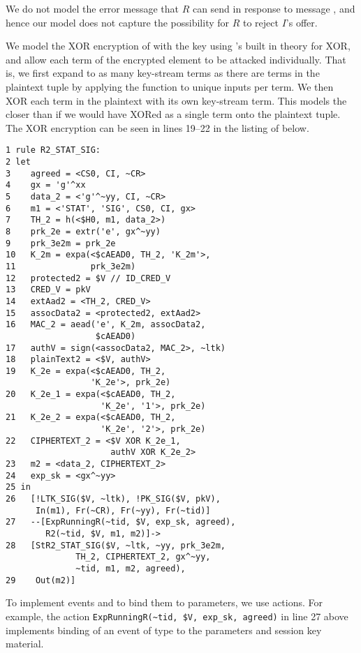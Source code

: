 We do not model the error message that $R$ can send in response to message
\mMsgone, and hence our model does not
capture the possibility for $R$ to reject $I$'s offer.
%

We model the XOR encryption of  with the key  using
\mTamarin{}'s built in theory for XOR, and allow each term of the encrypted
element to be attacked individually.
%
That is, we first expand  to as many key-stream terms as there are
terms in the plaintext tuple by applying the \mHkdfExpand{} function to unique
inputs per term.
%
We then XOR each term in the plaintext with its own key-stream term.
%
This models the \mSpec{} closer than if we would have XORed  as a
single term onto the plaintext tuple.
%
The XOR encryption can be seen in lines 19--22 in the listing of
 below.
%
\begin{small}
\begin{verbatim}
1 rule R2_STAT_SIG:
2 let
3    agreed = <CS0, CI, ~CR>
4    gx = 'g'^xx
5    data_2 = <'g'^~yy, CI, ~CR>
6    m1 = <'STAT', 'SIG', CS0, CI, gx>
7    TH_2 = h(<$H0, m1, data_2>)
8    prk_2e = extr('e', gx^~yy)
9    prk_3e2m = prk_2e
10   K_2m = expa(<$cAEAD0, TH_2, 'K_2m'>,
11               prk_3e2m)
12   protected2 = $V // ID_CRED_V
13   CRED_V = pkV
14   extAad2 = <TH_2, CRED_V>
15   assocData2 = <protected2, extAad2>
16   MAC_2 = aead('e', K_2m, assocData2,
                  $cAEAD0)
17   authV = sign(<assocData2, MAC_2>, ~ltk)
18   plainText2 = <$V, authV>
19   K_2e = expa(<$cAEAD0, TH_2,
                 'K_2e'>, prk_2e)
20   K_2e_1 = expa(<$cAEAD0, TH_2,
                   'K_2e', '1'>, prk_2e)
21   K_2e_2 = expa(<$cAEAD0, TH_2,
                   'K_2e', '2'>, prk_2e)
22   CIPHERTEXT_2 = <$V XOR K_2e_1,
                     authV XOR K_2e_2>
23   m2 = <data_2, CIPHERTEXT_2>
24   exp_sk = <gx^~yy>
25 in
26   [!LTK_SIG($V, ~ltk), !PK_SIG($V, pkV),
      In(m1), Fr(~CR), Fr(~yy), Fr(~tid)]
27   --[ExpRunningR(~tid, $V, exp_sk, agreed),
        R2(~tid, $V, m1, m2)]->
28   [StR2_STAT_SIG($V, ~ltk, ~yy, prk_3e2m,
              TH_2, CIPHERTEXT_2, gx^~yy,
              ~tid, m1, m2, agreed),
29    Out(m2)]
\end{verbatim}
\end{small}
%

To implement events and
to bind them to parameters, we use actions.
%
For example, the action \verb|ExpRunningR(~tid, $V, exp_sk, agreed)| in line 27
above implements binding of an event of type \mRStart{} to the parameters and session key
material.
%

